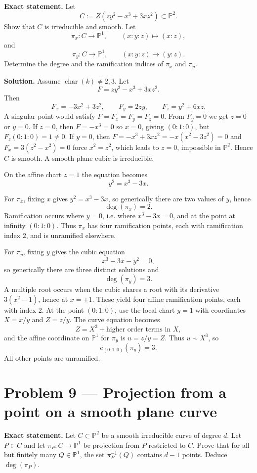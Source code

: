 \documentclass[12pt,a4paper]{article}
\theoremstyle{plain}
\theoremstyle{definition}      %
\begin{document}
\textbf{Exact statement.}
Let
\[
C:=Z(zy^2-x^3+3xz^2)\subset \mathbb P^2.
\]
Show that \(C\) is irreducible and smooth.
Let
\[
\pi_x:C\to\mathbb P^1,
\qquad
(x:y:z)\mapsto (x:z),
\]
and
\[
\pi_y:C\to\mathbb P^1,
\qquad
(x:y:z)\mapsto (y:z).
\]
Determine the degree and the ramification indices of \(\pi_x\) and \(\pi_y\).

\textbf{Solution.}
Assume \(\operatorname{char}(k)\neq 2,3\).
Let
\[
F=zy^2-x^3+3xz^2.
\]
Then
\[
F_x=-3x^2+3z^2,
\qquad
F_y=2zy,
\qquad
F_z=y^2+6xz.
\]
A singular point would satisfy \(F=F_x=F_y=F_z=0\).
From \(F_y=0\) we get \(z=0\) or \(y=0\).
If \(z=0\), then \(F=-x^3=0\) so \(x=0\), giving \((0:1:0)\), but \(F_z(0:1:0)=1\neq 0\).
If \(y=0\), then \(F=-x^3+3xz^2=-x(x^2-3z^2)=0\) and \(F_x=3(z^2-x^2)=0\) force \(x^2=z^2\), which leads to \(z=0\), impossible in \(\mathbb P^2\).
Hence \(C\) is smooth.
A smooth plane cubic is irreducible.

On the affine chart \(z=1\) the equation becomes
\[
y^2=x^3-3x.
\]

For \(\pi_x\), fixing \(x\) gives \(y^2=x^3-3x\), so generically there are two values of \(y\), hence
\[
\deg(\pi_x)=2.
\]
Ramification occurs where \(y=0\), i.e. where \(x^3-3x=0\), and at the point at infinity \((0:1:0)\).
Thus \(\pi_x\) has four ramification points, each with ramification index \(2\), and is unramified elsewhere.

For \(\pi_y\), fixing \(y\) gives the cubic equation
\[
x^3-3x-y^2=0,
\]
so generically there are three distinct solutions and
\[
\deg(\pi_y)=3.
\]
A multiple root occurs when the cubic shares a root with its derivative \(3(x^2-1)\), hence at \(x=\pm 1\).
These yield four affine ramification points, each with index \(2\).
At the point \((0:1:0)\), use the local chart \(y=1\) with coordinates \(X=x/y\) and \(Z=z/y\).
The curve equation becomes
\[
Z=X^3+\text{higher order terms in }X,
\]
and the affine coordinate on \(\mathbb P^1\) for \(\pi_y\) is \(u=z/y=Z\).
Thus \(u\sim X^3\), so
\[
e_{(0:1:0)}(\pi_y)=3.
\]
All other points are unramified.


\section*{Problem 9 — Projection from a point on a smooth plane curve}

\textbf{Exact statement.}
Let \(C\subset\mathbb P^2\) be a smooth irreducible curve of degree \(d\).
Let \(P\in C\) and let \(\pi_P:C\to\mathbb P^1\) be projection from \(P\) restricted to \(C\).
Prove that for all but finitely many \(Q\in\mathbb P^1\), the set \(\pi_P^{-1}(Q)\) contains \(d-1\) points.
Deduce \(\deg(\pi_P)\).
\end{document}
